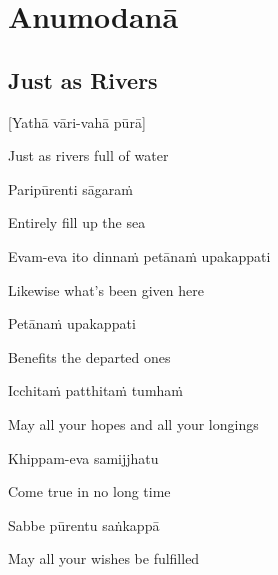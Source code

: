 
\chapter{Anumodanā}
\clearpage

\section{Just as Rivers}
\label{just-as-rivers}

[Yathā vāri-vahā pūrā]

\begin{english}
  Just as rivers full of water
\end{english}

Paripūrenti sāgaraṁ

\begin{english}
  Entirely fill up the sea
\end{english}

Evam-eva ito dinnaṁ petānaṁ upakappati

\begin{english}
  Likewise what's been given here\hyperlink{endnote1-appendix}{\hypertarget{endnote1-body}{}}
\end{english}

Petānaṁ upakappati

\begin{english}
  Benefits the departed ones\hyperlink{endnote1-appendix}{\hypertarget{endnote1-body}{}}
\end{english}


Icchitaṁ patthitaṁ tumhaṁ

\begin{english}
  May all your hopes and all your longings
\end{english}

Khippam-eva samijjhatu

\begin{english}
  Come true in no long time
\end{english}

Sabbe pūrentu saṅkappā

\begin{english}
  May all your wishes be fulfilled
\end{english}

